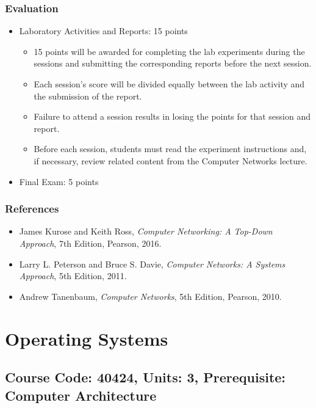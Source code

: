 \documentclass[12pt]{article}
\begin{document}
\subsubsection*{Evaluation}
\begin{itemize}
    \item Laboratory Activities and Reports: 15 points
    \begin{itemize}
        \item 15 points will be awarded for completing the lab experiments during the sessions and submitting the corresponding reports before the next session.
        \item Each session's score will be divided equally between the lab activity and the submission of the report.
        \item Failure to attend a session results in losing the points for that session and report.
        \item Before each session, students must read the experiment instructions and, if necessary, review related content from the Computer Networks lecture.
    \end{itemize}
    \item Final Exam: 5 points
\end{itemize}

\subsubsection*{References}
\begin{itemize}
    \item James Kurose and Keith Ross, \textit{Computer Networking: A Top-Down Approach}, 7th Edition, Pearson, 2016.
    \item Larry L. Peterson and Bruce S. Davie, \textit{Computer Networks: A Systems Approach}, 5th Edition, 2011.
    \item Andrew Tanenbaum, \textit{Computer Networks}, 5th Edition, Pearson, 2010.
\end{itemize}

\newpage

\section{Operating Systems}
\subsection*{Course Code: 40424, Units: 3, Prerequisite: Computer Architecture}
\end{document}

